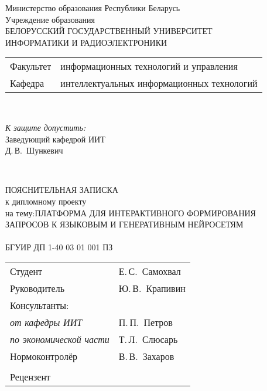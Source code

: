 \begin{titlepage}
  \begin{center}
    Министерство образования Республики Беларусь\\[1em]
    Учреждение образования\\
    БЕЛОРУССКИЙ ГОСУДАРСТВЕННЫЙ УНИВЕРСИТЕТ \\
    ИНФОРМАТИКИ И РАДИОЭЛЕКТРОНИКИ\\[1em]

    \begin{minipage}{\textwidth}
      \begin{flushleft}
        \begin{tabular}{ l l }
          Факультет & информационных технологий и управления\\
          Кафедра   & интеллектуальных информационных технологий
        \end{tabular}
      \end{flushleft}
    \end{minipage}\\[1em]

    \begin{flushright}
      \begin{minipage}{0.4\textwidth}
        \textit{К защите допустить:}\\[0.8em]
        Заведующий кафедрой ИИТ\\[0.45em]
        \underline{\hspace*{2.8cm}} Д.\,В.~Шункевич
      \end{minipage}\\[2.2em]
    \end{flushright}

    {ПОЯСНИТЕЛЬНАЯ ЗАПИСКА}\\
    {к дипломному проекту}\\

    {на тему:ПЛАТФОРМА ДЛЯ ИНТЕРАКТИВНОГО
    ФОРМИРОВАНИЯ ЗАПРОСОВ К
    ЯЗЫКОВЫМ И ГЕНЕРАТИВНЫМ
    НЕЙРОСЕТЯМ}\\[1em]
    \textbf{\large \MakeUppercase{\topicName}}\\[1em]


    {БГУИР ДП 1-40 03 01 001 ПЗ}\\[2em]
    
    \begin{tabular}{ p{}p{} }
      Студент & Е.\,С.~Самохвал \\
      Руководитель & Ю.\,В.~Крапивин \\
      Консультанты: &\\
      \hspace*{3ex}\emph{от кафедры ИИТ} & П.\,П.~Петров \\
      \hspace*{3ex}\emph{по экономической части} & Т.\,Л.~Слюсарь \\
      Нормоконтролёр & В.\,В.~Захаров\\
      & \\
      Рецензент &
    \end{tabular}
    

\end{center}
\end{titlepage}
